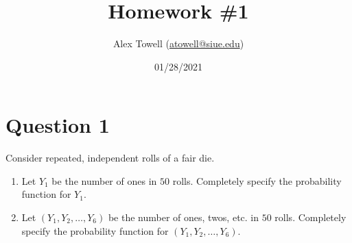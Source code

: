 \documentclass[12pt]{fphw}[final]
\title{Homework \#1} %
\author{Alex Towell (\href{mailto:atowell@siue.edu}{atowell@siue.edu})} %
\date{01/28/2021} %
\institute{Southern Illinois University-Edwardsville}
\begin{document}
\maketitle %
	
\section*{Question 1}

\begin{problem}
Consider repeated, independent rolls of a fair die.
\medskip
\begin{enumerate} %
	\item Let $Y_1$ be the number of ones in $50$ rolls.
	Completely specify the probability function for $Y_1$.
	\item Let $(Y_1,Y_2,\ldots,Y_6)$ be the number of ones, twos, etc. in $50$ rolls.
	Completely specify the probability function for $(Y_1,Y_2,\ldots,Y_6)$.
\end{enumerate}
\end{problem}
\end{document}
